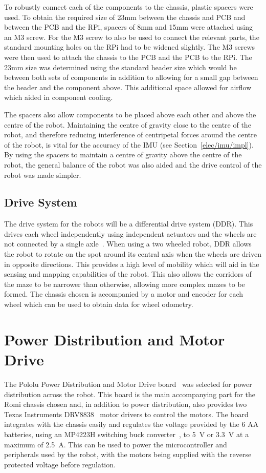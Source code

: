 To robustly connect each of the components to the
chassis, plastic spacers were used. To obtain the required size
of 23mm between the chassis and PCB
and between the PCB and the RPi, spacers of 8mm and 15mm
were attached using an M3 screw. For the M3 screw to also
be used to connect the relevant parts, the standard mounting holes
on the RPi had to be widened slightly. The M3 screws were
then used to attach the chassis to the PCB and the PCB to the
RPi. The 23mm size was determined using the standard
header size which would be between both sets of components in
addition to allowing for a small gap between the header and the
component above. This additional space allowed for airflow which
aided in component cooling.

The spacers also allow components to be placed above each other
and above the centre of the robot. Maintaining the centre of
gravity close to the centre of the robot, and therefore reducing
interference of centripetal forces around the centre of the robot,
is vital for the accuracy of the IMU (see Section~\ref{elec/imu/impl}). By using
the spacers to maintain a centre of gravity above the centre of the
robot, the general balance of the robot was also aided and the drive
control of the robot was made simpler.

\subsection{Drive System}\label{mech/chassis/drive}

The drive system for the robots will be a differential drive system (DDR).
This drives each wheel independently using independent actuators and the
wheels are not connected by a single axle~\cite[p.~146]{braunl_embedded_2013}.
When using a two wheeled robot, DDR allows the
robot to rotate on the spot around its central axis when the wheels
are driven in opposite directions. This provides a high level of
mobility which will aid in the sensing and mapping capabilities of
the robot. This also allows the corridors of the maze to be narrower
than otherwise, allowing more complex mazes to be formed. The
chassis chosen is accompanied by a motor and encoder for each wheel
which can be used to obtain data for wheel odometry.


\section{Power Distribution and Motor Drive}\label{elec/poweranddrive}
The Pololu Power Distribution and Motor Drive board~\cite{pololupower}
was selected for power distribution across
the robot. This board is the main accompanying part for the Romi
chassis chosen and, in addition to power distribution, also provides
two Texas Instruments DRV8838~\cite{texasdrivers} motor drivers to control
the motors. The board integrates with the chassis easily
and regulates the voltage provided by the 6 AA batteries, using an
MP4223H switching buck converter~\cite{mpbuck}, to \SI{5}{\volt} or
\SI{3.3}{\volt} at a maximum of \SI{2.5}{\ampere}. This can be used
to power the microcontroller and peripherals used by the robot, with the
motors being supplied with the reverse protected voltage before regulation.

